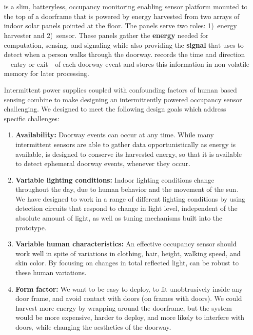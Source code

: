 \section{\sysname}
\label{sec:system}
\sysname is a slim, batteryless, occupancy monitoring enabling sensor platform mounted to the top of a doorframe that is powered by energy harvested from two arrays of indoor solar panels pointed at the floor.
The panels serve two roles: 1)~energy harvester and 2)~sensor.
These panels gather the \textbf{energy} needed for computation, sensing, and signaling while also providing the \textbf{signal} that \sysname uses to detect when a person walks through the doorway.
\sysname records the time and direction---entry or exit---of each doorway event and stores this information in non-volatile memory for later processing.


 Intermittent power supplies coupled with confounding factors of human based sensing combine to make designing an intermittently powered occupancy sensor challenging.
We designed \sysname to meet the following design goals which address specific challenges:
\begin{enumerate}
	\item \textbf{Availability:} Doorway events can occur at any time.
	While many intermittent sensors are able to gather data opportunistically as energy is available, \sysname is designed to conserve its harvested energy, so that it is available to detect ephemeral doorway events, whenever they occur.
	\item \textbf{Variable lighting conditions:} Indoor lighting conditions change throughout the day, due to human behavior and the movement of the sun.
	We have designed \sysname to work in a range of different lighting conditions by using detection circuits that respond to change in light level, independent of the absolute amount of light, as well as tuning mechanisms built into the prototype.
	\item \textbf{Variable human characteristics:} An effective occupancy sensor should work well in spite of variations in clothing, hair, height, walking speed, and skin color. By focusing on changes in total reflected light, \sysname can be robust to these human variations.
	\item \textbf{Form factor:} We want \sysname to be easy to deploy, to fit unobtrusively inside any door frame, and avoid contact with doors (on frames with doors). We could harvest more energy by wrapping \sysname around the doorframe, but the system would be more expensive, harder to deploy, and more likely to interfere with doors, while changing the aesthetics of the doorway.
\end{enumerate}

